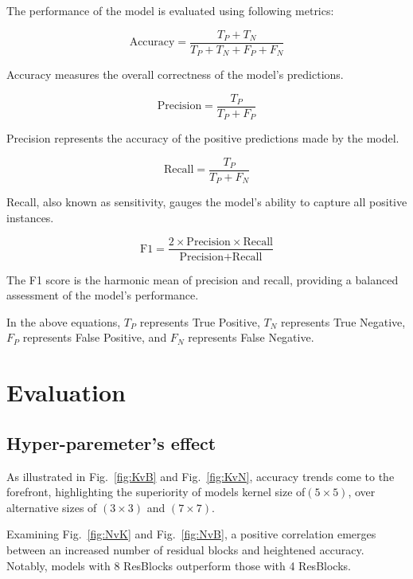 \documentclass[]{report}
\begin{document}
The performance of the model is evaluated using following metrics:

\begin{equation}
    \text{Accuracy} = \frac{T_P + T_N}{T_P + T_N + F_P + F_N}
\end{equation}

Accuracy measures the overall correctness of the model's predictions.

\begin{equation}
    \text{Precision} = \frac{T_P}{T_P + F_P}
\end{equation}

Precision represents the accuracy of the positive predictions made by the model.

\begin{equation}
    \text{Recall} = \frac{T_P}{T_P + F_N}
\end{equation}

Recall, also known as sensitivity, gauges the model's ability to capture all positive instances.

\begin{equation}
    \text{F1} = \frac{2 \times \text{Precision} \times \text{Recall}}{\text{Precision} + \text{Recall}}
\end{equation}

The F1 score is the harmonic mean of precision and recall, providing a balanced assessment of the model's performance.

In the above equations, $T_P$ represents True Positive, $T_N$ represents True Negative, $F_P$ represents False Positive, and $F_N$ represents False Negative.


\section{Evaluation}


\subsection{Hyper-paremeter's effect}
As illustrated in Fig.~\ref{fig:KvB} and Fig.~\ref{fig:KvN}, accuracy trends come to the forefront, highlighting the superiority of models kernel size  of$ (5\times5)$, over alternative sizes of $(3\times3)$ and $(7\times7)$.

Examining Fig.~\ref{fig:NvK} and Fig.~\ref{fig:NvB}, a positive correlation emerges between an increased number of residual blocks and heightened accuracy. Notably, models with 8 ResBlocks outperform those with 4 ResBlocks.
\end{document}
